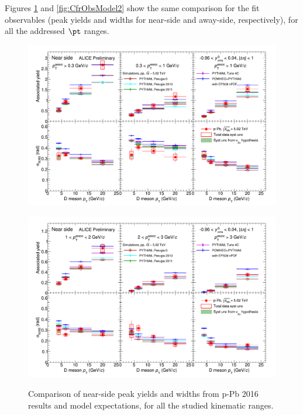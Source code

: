 Figures \ref{fig:CfrObsModel} and \ref{fig:CfrObsModel2} show the same comparison for the fit observables (peak yields and widths for near-side and away-side, respectively), for all the addressed $\pt$ ranges.

\begin{figure}[!htbp]
\centering
{\includegraphics[width=1.3\linewidth, angle=90]{figures/CfrPPandModels/ComparePPbtoMCFitResults.png}}
\end{figure}
\begin{figure}[!htbp]
\centering
{\includegraphics[width=1.3\linewidth, angle=90]{figures/CfrPPandModels/ComparePPbtoMCFitResults_2.png}}
\caption{Comparison of near-side peak yields and widths from p-Pb 2016 results and model expectations, for all the studied kinematic ranges.}
\label{fig:CfrObsModel}
\end{figure}

